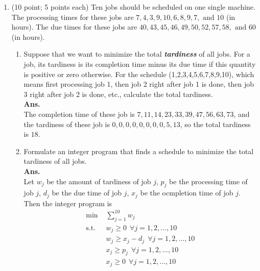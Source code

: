 \documentclass[12pt]{article}
\begin{document}
\begin{enumerate}
\begin{enumerate}
                  \item
            \end{enumerate}
      \item (10 point; 5 points each) Ten jobs should be scheduled on one single machine. The processing times for these jobs are $7, 4, 3, 9, 10, 6, 8, 9, 7, \text{ and } 10$ (in hours). The due times for these jobs are $40, 43, 45, 46, 49, 50, 52, 57, 58, \text{ and } 60$ (in hours).
            \begin{enumerate}
                  \item Suppose that we want to minimize the total \textbf{\textit{tardiness}} of all jobs. For a job, its tardiness is its completion time minus its due time if this quantity is positive or zero otherwise. For the schedule (1,2,3,4,5,6,7,8,9,10), which means first processing job 1, then job 2 right after job 1 is done, then job 3 right after job 2 is done, etc., calculate the total tardiness.\\
                        \textbf{Ans. }\\
                        The completion time of these job is $7,11,14,23,33,39,47,56,63,73$, and the tardiness of these job is $0,0,0,0,0,0,0,0,5,13$, so the total tardiness is $18$.
                  \item Formulate an integer program that finds a schedule to minimize the total tardiness of all jobs.\\
                        \textbf{Ans. }\\
                        Let $w_j$ be the amount of tardiness of job $j$, $p_j$ be the processing time of job $j$, $d_j$ be the due time of job $j$, $x_j$ be the ocmpletion time of job $j$. Then the integer program is
                        \begin{align*}
                              \text{min }  & \sum_{j=1}^{10} w_j                                                                    \\
                              \text{s.t. } & w_j \geq 0         \ \ \forall j = 1,2, ..., 10                                        \\
                                           & w_j \geq x_j - d_j \ \  \forall j=1,2, ...,10                                          \\
                                           & x_j \geq p_j   \ \ \forall j = 1,2, ..., 10                                            \\
                                           & x_j \geq 0     \ \ \forall j = 1,2, ..., 10                                            \\

\end{align*}
\end{enumerate}
\end{enumerate}
\end{document}
